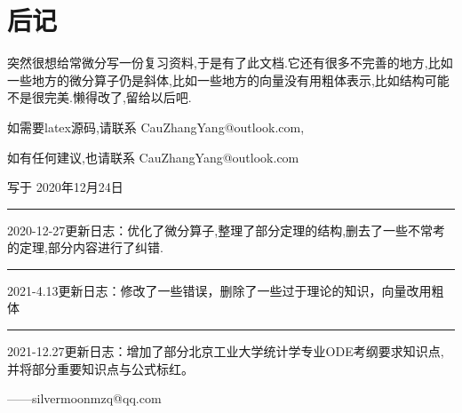 \documentclass{ctexart}
\numberwithin{equation}{subsection}
\begin{document}
\section{后记}
突然很想给常微分写一份复习资料,于是有了此文档.它还有很多不完善的地方,比如一些地方的微分算子仍是斜体,比如一些地方的向量没有用粗体表示,比如结构可能不是很完美.懒得改了,留给以后吧.

如需要latex源码,请联系 CauZhangYang@outlook.com,

如有任何建议,也请联系 CauZhangYang@outlook.com
 
写于 2020年12月24日

\rule[0pt]{0.9\linewidth}{0.09em}

2020-12-27更新日志：优化了微分算子,整理了部分定理的结构,删去了一些不常考的定理,部分内容进行了纠错.

\rule[0pt]{0.9\linewidth}{0.09em}

2021-4.13更新日志：修改了一些错误，删除了一些过于理论的知识，向量改用粗体

\rule[0pt]{0.9\linewidth}{0.09em}

2021-12.27更新日志：增加了部分北京工业大学统计学专业ODE考纲要求知识点,并将部分重要知识点与公式标红。

\quad \quad \quad \quad \quad \quad \quad \quad        ——silvermoonmzq@qq.com
\end{document}
